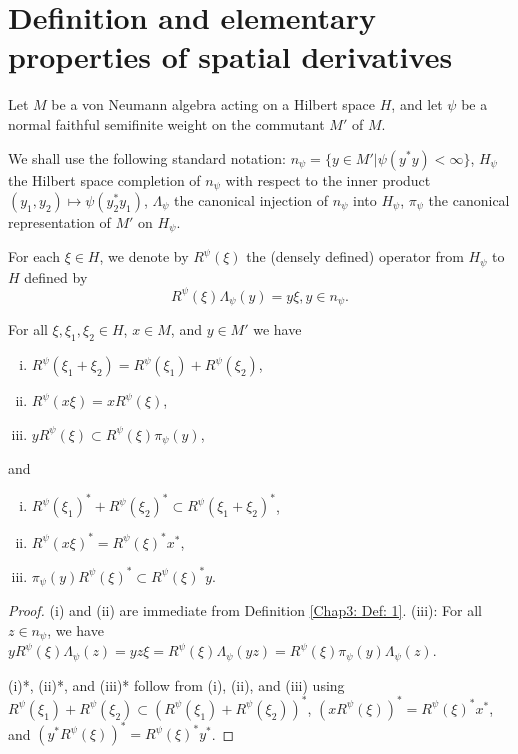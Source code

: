 \section{Definition and elementary properties of spatial derivatives}
Let $M$ be a von Neumann algebra acting on a Hilbert space $H$, and let $\psi$ be a normal faithful semifinite weight on the commutant $M'$ of $M$.\par
We shall use the following standard notation: $n_\psi=\{y\in M'|\psi(y^*y)<\infty\}$, $H_\psi$ the Hilbert space completion of $n_\psi$ with respect to the inner product $(y_1,y_2)\mapsto \psi(y_2^*y_1)$, $\Lambda_\psi$ the canonical injection of $n_\psi$ into $H_\psi$, $\pi_\psi$ the canonical representation of $M'$ on $H_\psi$.
\begin{definition}\label{Chap3: Def: 1}
    For each $\xi\in H$, we denote by $R^\psi(\xi)$ the (densely defined) operator from $H_\psi$ to $H$ defined by
    \begin{equation}
        R^\psi(\xi)\Lambda_\psi(y)=y\xi,y\in n_\psi.
    \end{equation}
\end{definition}
\begin{proposition}\label{Chap3: Prop: 2}
    For all $\xi,\xi_1,\xi_2\in H$, $x\in M$, and $y\in M'$ we have
    \begin{enumerate}[(i)]
        \item $R^\psi(\xi_1+\xi_2)=R^\psi(\xi_1)+R^\psi(\xi_2)$,
        \item $R^\psi(x\xi)=xR^\psi(\xi)$,
        \item $yR^\psi(\xi)\subset R^\psi(\xi)\pi_\psi(y)$,
    \end{enumerate}
    and
    \begin{enumerate}[(i)*]
        \item $R^\psi(\xi_1)^*+R^\psi(\xi_2)^*\subset R^\psi(\xi_1+\xi_2)^*$,
        \item $R^\psi(x\xi)^*=R^\psi(\xi)^*x^*$,
        \item $\pi_\psi(y)R^\psi(\xi)^*\subset R^\psi(\xi)^*y$.
    \end{enumerate}
\end{proposition}
\begin{proof}
    (i) and (ii) are immediate from Definition \ref{Chap3: Def: 1}. (iii): For all $z\in n_\psi$, we have $yR^\psi(\xi)\Lambda_\psi(z)=yz\xi=R^\psi(\xi)\Lambda_\psi(yz)=R^\psi(\xi)\pi_\psi(y)\Lambda_\psi(z)$.\par
    (i)*, (ii)*, and (iii)* follow from (i), (ii), and (iii) using $R^\psi(\xi_1)+R^\psi(\xi_2)\subset (R^\psi(\xi_1)+R^\psi(\xi_2))^*$, $(xR^\psi(\xi))^*=R^\psi(\xi)^*x^*$, and $(y^*R^\psi(\xi))^*=R^\psi(\xi)^*y^*$.
\end{proof}
